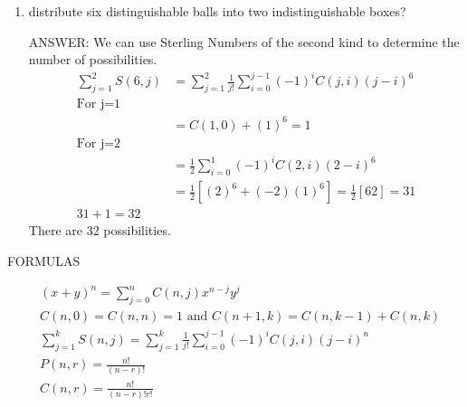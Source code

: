 \documentclass[12pt]{article}
\newcommand\buf{\vspace{0.10in}}
\newenvironment{answer}{\fontfamily{ptm}\selectfont \smaller[1] ANSWER: }{}
\begin{document}
\begin{enumerate}
\begin{enumerate}
    \begin{answer}
        We can use the stars and bars method to determine the number of possibilities. There are $C(6 + 9 - 1, 6) = C(14, 6) = \frac{14!}{(14-6)!(6!)} = \frac{14!}{(8!)(6!)} = (7)(13)(11)(3) = 3003$ possibilities.
    \end{answer}
    \buf

    \item distribute six distinguishable balls into two indistinguishable boxes?
    \buf

    \begin{answer}
        We can use Sterling Numbers of the second kind to determine the number of possibilities.
        \begin{align*}
            \sum_{j=1}^{2} S(6, j) &= \sum_{j=1}^{2} \frac{1}{j!} \sum_{i=0}^{j-1}(-1)^{i} C(j, i) (j-i)^{6} \\
            \text{For j=1} \\
            &= C(1, 0) + (1)^{6} = 1 \\
            \text{For j=2} \\
            &= \frac{1}{2} \sum_{i=0}^{1}(-1)^{i}C(2, i)(2-i)^{6} \\
            &= \frac{1}{2}[(2)^{6} + (-2)(1)^{6}] = \frac{1}{2}[62] = 31 \\
            31 + 1 = 32
        \end{align*}
        There are 32 possibilities. 
    \end{answer}
    \buf

\end{enumerate}

\end{enumerate} %

\newpage

\begin{center}
    FORMULAS
\end{center}

\begin{align}
    &(x+y)^{n} = \sum_{j=0}^{n} C(n, j) x^{n-j} y^{j} \\
    &C(n, 0) = C(n, n) = 1 \text{ and } C(n+1, k) = C(n, k-1) + C(n, k) \\
    &\sum_{j=1}^{k} S(n, j) = \sum_{j=1}^{k} \frac{1}{j!} \sum_{i=0}^{j-1} (-1)^{i} C(j, i) (j-i)^{n} \\
    &P(n, r) = \frac{n!}{(n-r)!} \\
    &C(n, r) = \frac{n!}{(n-r)! r!} \\
\end{align}
\end{document}
